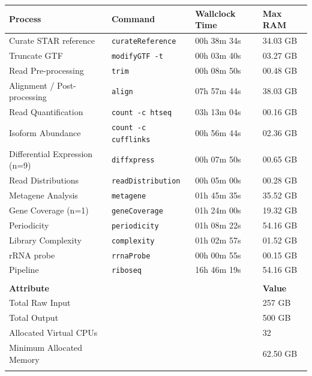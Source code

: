 \documentclass[10pt, oneside]{article}
\begin{document}
\begin{table}[h]
    \centering
{}
\begin{tabular}{p{4.8cm}p{3.7cm}p{2.7cm}p{1.8cm}}
\textbf{Process} & \textbf{Command} & \textbf{Wallclock Time} & \textbf{Max RAM}\\
  \hline
  Curate STAR reference & \texttt{curateReference} & 00h 38m 34s & 34.03 GB \\
  \hline
  Truncate GTF & \texttt{modifyGTF -t} & 00h 03m 40s & 03.27 GB \\
  \hline
  Read Pre-processing & \texttt{trim} & 00h 08m 50s & 00.48 GB \\
  \hline
  Alignment / Post-processing & \texttt{align} & 07h 57m 44s & 38.03 GB \\
  \hline
  Read Quantification & \texttt{count -c htseq} & 03h 13m 04s & 00.16 GB \\
  \hline
  Isoform Abundance & \texttt{count -c cufflinks} & 00h 56m 44s & 02.36 GB \\
  \hline
  Differential Expression (n=9) & \texttt{diffxpress} & 00h 07m 50s & 00.65 GB \\
  \hline
  Read Distributions & \texttt{readDistribution} & 00h 05m 00s & 00.28 GB \\
  \hline
  Metagene Analysis & \texttt{metagene} & 01h 45m 35s & 35.52 GB \\
  \hline
  Gene Coverage (n=1) & \texttt{geneCoverage} & 01h 24m 00s & 19.32 GB \\
  \hline
  Periodicity & \texttt{periodicity} & 01h 08m 22s & 54.16 GB \\
  \hline
  Library Complexity & \texttt{complexity} & 01h 02m 57s & 01.52 GB \\
  \hline
  rRNA probe & \texttt{rrnaProbe} & 00h 00m 55s & 00.15 GB \\
  \hline
  Pipeline & \texttt{riboseq} & 16h 46m 19s & 54.16 GB \\
  \hline
  & & & \\
  \hline
  \hline
  \textbf{Attribute} & & & \textbf{Value}\\
  \hline
  Total Raw Input & & & 257 GB \\
  \hline
  Total Output & & & 500 GB \\
  \hline
  Allocated Virtual CPUs & & & 32 \\
  \hline
  Minimum Allocated Memory & & & 62.50 GB \\
 \label{tab:chpc_performance}
\end{tabular}
\end{table}
\end{document}

